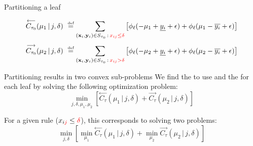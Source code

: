 \documentclass{beamer}
\newcommand{\ylower}[1]{\ensuremath{\underline{y_{#1}}}}
\newcommand{\yupper}[1]{\ensuremath{\overline{y_{#1}}}}
\begin{document}
\begin{frame}{Partitioning a leaf}
	\begin{center}
		\resizebox{\textwidth}{!}{}
	\end{center}
	\pause
	\begin{equation*}\label{eq:cost_left}
	\overset{\longleftarrow}{C_{\tau_0}}(\mu_1 \,|\, j, \delta) \ \eqdef \sum_{(\xb_i, \yb_i) \in S_{\tau_0}\,:\,\red{x_{ij} \leq \delta}} \left[ \phi_\ell(-\mu_1 + \ylower{i} + \epsilon) + \phi_\ell(\mu_1 - \yupper{i} + \epsilon) \right]
	\end{equation*}
	\pause
	\begin{equation*}\label{eq:cost_right}
	\overset{\longrightarrow}{C_{\tau_0}}(\mu_2 \,|\, j, \delta) \ \eqdef \sum_{(\xb_i, \yb_i) \in S_{\tau_0}\,:\,\red{x_{ij} > \delta}} \left[ \phi_\ell(-\mu_2 + \ylower{i} + \epsilon) + \phi_\ell(\mu_2 - \yupper{i} + \epsilon) \right]
	\end{equation*}
\end{frame}

\begin{frame}{Partitioning results in two convex sub-problems}
	We find the  to use and the  for each leaf by solving the following optimization problem:
	\begin{equation*}
	\displaystyle\min_{j, \delta, \mu_1, \mu_2} \left[ \overset{\longleftarrow}{C_\tau}(\mu_1 \,|\, j, \delta) + \overset{\longrightarrow}{C_\tau}(\mu_2 \,|\, j, \delta) \right]
	\end{equation*}
	\vspace*{5mm}
	
	\pause
	For a given rule ($x_{i\textcolor{red}{j}} \leq \textcolor{red}{\delta}$), this corresponds to solving two  problems:
	\begin{equation*}
	\min_{j,\delta} \left[ \min_{\mu_1} \overset{\longleftarrow}{C_\tau}(\mu_1 \,|\, j, \delta) +
	\min_{\mu_2} \overset{\longrightarrow}{C_\tau}(\mu_2 \,|\, j, \delta) \right]
	\end{equation*}
\end{frame}
\end{document}
